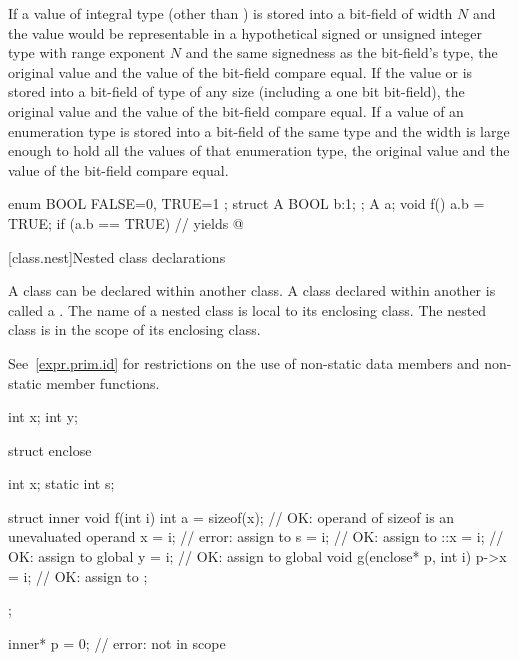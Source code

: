 \pnum
If a value of integral type (other than ) is stored
into a bit-field of width $N$ and the value would be representable
in a hypothetical signed or unsigned integer type
with range exponent $N$ and the same signedness as the bit-field's type,
the original value and the value of the bit-field compare equal.
If the value  or  is stored into a bit-field of
type  of any size (including a one bit bit-field), the
original  value and the value of the bit-field compare
equal. If a value of an enumeration type is stored into a bit-field of the
same type and the width is large
enough to hold all the values of that enumeration type,
the original value and the value of the bit-field compare equal.
\begin{example}

\begin{codeblock}
enum BOOL { FALSE=0, TRUE=1 };
struct A {
  BOOL b:1;
};
A a;
void f() {
  a.b = TRUE;
  if (a.b == TRUE)              // yields 
    { @\commentellip@ }
}
\end{codeblock}
\end{example}

[class.nest]{Nested class declarations}%
%

\pnum
A class can be declared within another class. A class declared within
another is called a . The name of a nested class
is local to its enclosing class.
%
The nested class is in the scope of its enclosing class.
\begin{note}
See~\ref{expr.prim.id} for restrictions on the use of non-static data
members and non-static member functions.
\end{note}

\begin{example}
\begin{codeblock}
int x;
int y;

struct enclose {
  int x;
  static int s;

  struct inner {
    void f(int i) {
      int a = sizeof(x);        // OK: operand of sizeof is an unevaluated operand
      x = i;                    // error: assign to 
      s = i;                    // OK: assign to 
      ::x = i;                  // OK: assign to global 
      y = i;                    // OK: assign to global 
    }
    void g(enclose* p, int i) {
      p->x = i;                 // OK: assign to 
    }
  };
};

inner* p = 0;                   // error:  not in scope
\end{codeblock}
\end{example}


